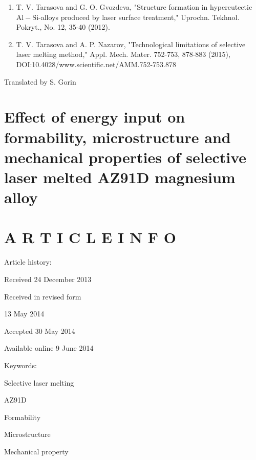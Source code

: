 \documentclass[10pt]{article}
\begin{document}
\begin{enumerate}
  \item T. V. Tarasova and G. O. Gvozdeva, "Structure formation in hypereutectic $\mathrm{Al}-\mathrm{Si}$-alloys produced by laser surface treatment," Uprochn. Tekhnol. Pokryt., No. 12, 35-40 (2012).

  \item T. V. Tarasova and A. P. Nazarov, "Technological limitations of selective laser melting method," Appl. Mech. Mater. 752-753, 878-883 (2015), DOI:10.4028/www.scientific.net/AMM.752-753.878

\end{enumerate}

Translated by S. Gorin

\section*{Effect of energy input on formability, microstructure and mechanical properties of selective laser melted AZ91D magnesium alloy }


\section*{A R T I C L E I N F O}
Article history:

Received 24 December 2013

Received in revised form

13 May 2014

Accepted 30 May 2014

Available online 9 June 2014

Keywords:

Selective laser melting

AZ91D

Formability

Microstructure

Mechanical property
\end{document}
